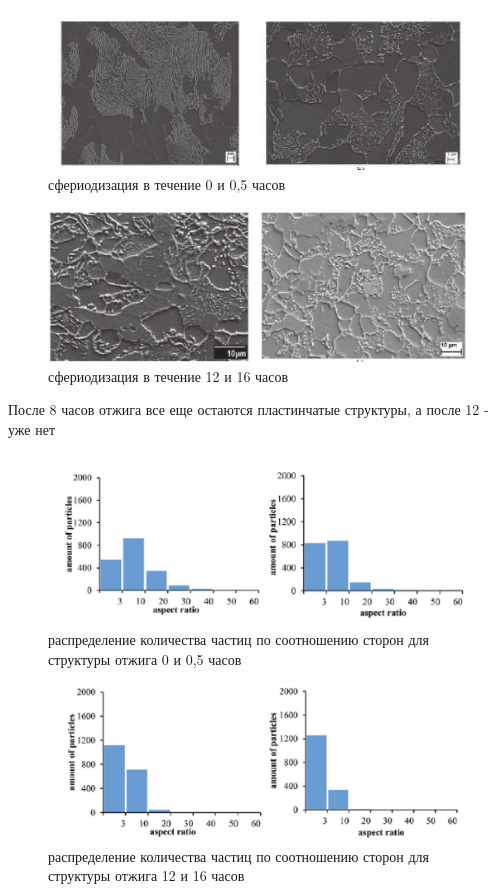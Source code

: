 \documentclass[a4paper, 14pt]{article}
\begin{document}
	\begin{figure}[h!]
		\centering
		\includegraphics[scale=1.5]{images/0-0.5}
		\caption{ сфериодизация в течение 0 и 0,5 часов}
	\end{figure}
	
	\begin{figure}[h!]
		\centering
		\includegraphics[scale=0.55]{images/12-16}
		\caption{ сфериодизация в течение 12 и 16 часов}
	\end{figure}
	
	После 8 часов отжига все еще остаются пластинчатые структуры, а после 12 - уже нет
	
	\begin{figure}[h!]
	\centering
	\includegraphics[scale=0.55]{images/ratio0-0.5}
	\caption{распределение количества частиц по соотношению сторон для структуры отжига 0 и 0,5 часов}
	\end{figure}
	
	\begin{figure}[h!]
		\centering
		\includegraphics[scale=0.55]{images/ratio12-16}
		\caption{распределение количества частиц по соотношению сторон для структуры отжига 12 и 16 часов}
	\end{figure}
\end{document}
